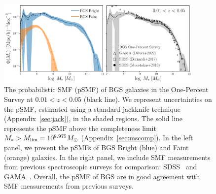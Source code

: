 

\begin{figure}
\begin{center}
    \includegraphics[width=0.9\textwidth]{figs/psmf_bgs_any_comp.pdf} 
    \caption{
        The probabilistic SMF (pSMF) of BGS galaxies in the One-Percent Survey
        at $0.01 < z < 0.05$ (black line). 
        We represent uncertainties on the pSMF, estimated using a standard
        jackknife technique (Appendix~\ref{sec:jack}), in the shaded regions.
        The solid line represents the pSMF above the completeness limit 
        $M_* > M_{\rm lim} = 10^{8.975}M_\odot$ (Appendix~\ref{sec:mscomp}).
        In the left panel, we present the pSMFs of BGS Bright (blue) and
        Faint (orange) galaxies. 
        In the right panel, we include SMF measurements from previous
        spectroscopic surveys for comparison: SDSS~\citep{moustakas2013,
        bernardi2017} and GAMA~\citep{driver2022}. 
        Overall, the pSMF of BGS are in good agreement with SMF
        measurements from previous surveys.  
    }\label{fig:psmf}
\end{center}
\end{figure}

